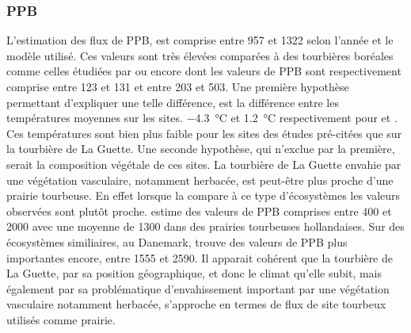 \subsubsection{PPB}

%


L'estimation des flux de PPB, est comprise entre 957 et \SI{1322}{\gcma} selon l'année et le modèle utilisé.
Ces valeurs sont très élevées comparées à des tourbières boréales comme celles étudiées par \citep{trudeau2014} ou encore \citep{peichl2014} dont les valeurs de PPB sont respectivement comprise entre 123 et \SI{131}{\gcma} et entre 203 et \SI{503}{\gcma}.
Une première hypothèse permettant d'expliquer une telle différence, est la différence entre les températures moyennes sur les sites.
\SI{-4.3}{\degreeCelsius} et \SI{1.2}{\degreeCelsius} respectivement pour \citet{trudeau2014} et \citet{peichl2014}.
Ces températures sont bien plus faible pour les sites des études pré-citées que sur la tourbière de La Guette.
Une seconde hypothèse, qui n'exclue par la première, serait la composition végétale de ces sites. 
La tourbière de La Guette envahie par une végétation vasculaire, notamment herbacée, est peut-être plus proche d'une prairie tourbeuse.
En effet lorsque la compare à ce type d'écosystèmes les valeurs observées sont plutôt proche.
\citep{jacobs2007} estime des valeurs de PPB comprises entre 400 et \SI{2000}{\gcma} avec une moyenne de \SI{1300}{\gcma} dans des prairies tourbeuses hollandaises.
Sur des écosystèmes similiaires, au Danemark, \citep{gorres2014} trouve des valeurs de PPB plus importantes encore, entre 1555 et \SI{2590}{\gcma}.
Il apparait cohérent que la tourbière de La Guette, par sa position géographique, et donc le climat qu'elle subit, mais également par sa problématique d'envahissement important par une végétation vasculaire notamment herbacée, s'approche en termes de flux de site tourbeux utilisés comme prairie.
%
%
%
%

